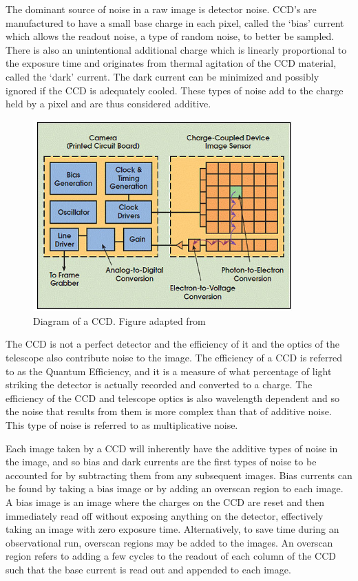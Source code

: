 The dominant source of noise in a raw image is detector noise. \gls{CCD}'s are manufactured to have a small base charge in each pixel, called the `bias' current which allows the readout noise, a type of random noise, to better be sampled. There is also an unintentional additional charge which is linearly proportional to the exposure time and originates from thermal agitation of the \gls{CCD} material, called the `dark' current. The dark current can be minimized and possibly ignored if the \gls{CCD} is adequately cooled. These types of noise add to the charge held by a pixel and are thus considered additive.
\prgph

\begin{figure}[t]
    \centering
    \includegraphics[width = 10cm]{figures/2_ccd.jpg}
    \caption{Diagram of a \gls{CCD}. Figure adapted from \citep{ccd_fig}}
    \label{fig:ccd_diagram}
\end{figure}


The \gls{CCD} is not a perfect detector and the efficiency of it and the optics of the telescope also contribute noise to the image. The efficiency of a \gls{CCD} is referred to as the Quantum Efficiency, and it is a measure of what percentage of light striking the detector is actually recorded and converted to a charge. The efficiency of the \gls{CCD} and telescope optics is also wavelength dependent and so the noise that results from them is more complex than that of additive noise. This type of noise is referred to as multiplicative noise.
\prgph

Each image taken by a \gls{CCD} will inherently have the additive types of noise in the image, and so bias and dark currents are the first types of noise to be accounted for by subtracting them from any subsequent images. Bias currents can be found by taking a bias image or by adding an overscan region to each image. A bias image is an image where the charges on the \gls{CCD} are reset and then immediately read off without exposing anything on the detector, effectively taking an image with zero exposure time. Alternatively, to save time during an observational run, overscan regions may be added to the images. An overscan region refers to adding a few cycles to the readout of each column of the \gls{CCD} such that the base current is read out and appended to each image.
\prgph

